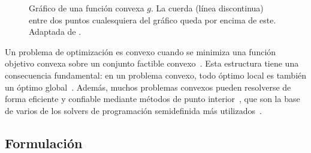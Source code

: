 \begin{figure}[H]
    \centering
    \caption[Gráfico de una función convexa.]{Gráfico de una función convexa $g$. La cuerda (línea discontinua) entre dos puntos
    cualesquiera del gráfico queda por encima de este. Adaptada de
    \textcite[p.~67]{boydConvexOptimization2004}.}
    \label{fig:funcion_convexa}
\end{figure}

Un problema de optimización es convexo cuando se minimiza una función objetivo convexa sobre un
conjunto factible convexo~\parencite[pp.~136--137]{boydConvexOptimization2004}. Esta estructura
tiene una consecuencia fundamental: en un problema convexo, todo óptimo local es también un
óptimo global~\parencite[p.~138]{boydConvexOptimization2004}. Además, muchos problemas convexos pueden
resolverse de forma eficiente y confiable mediante métodos de punto
interior~\parencite[pp.~7--8]{boydConvexOptimization2004}, que son la base de varios de los
solvers de programación semidefinida más utilizados~\parencite{vandenbergheSemidefiniteProgramming1996}.

\subsection{Formulación}
\label{subsec:sdp_formulacion}

